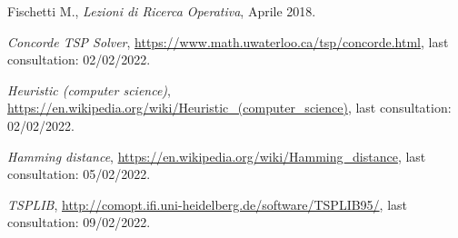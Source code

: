 \begin{thebibliography}{99}


 Fischetti M., \textit{Lezioni di Ricerca Operativa}, Aprile 2018.

 \textit{Concorde TSP Solver}, \url{https://www.math.uwaterloo.ca/tsp/concorde.html}, last consultation: 02/02/2022.

 \textit{Heuristic (computer science)}, \url{https://en.wikipedia.org/wiki/Heuristic_(computer_science)}, last consultation: 02/02/2022.

 \textit{Hamming distance}, \url{https://en.wikipedia.org/wiki/Hamming_distance}, last consultation: 05/02/2022.

 \textit{TSPLIB}, \url{http://comopt.ifi.uni-heidelberg.de/software/TSPLIB95/}, last consultation: 09/02/2022.




\end{thebibliography}

